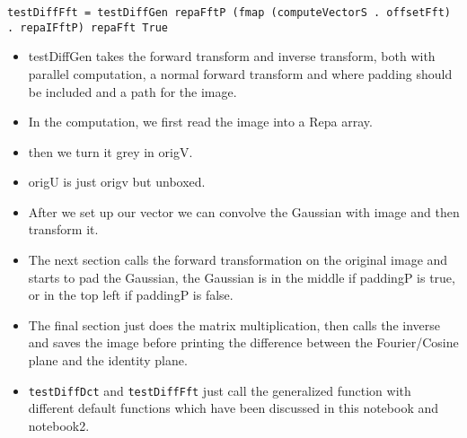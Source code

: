 \documentclass{article}
\begin{document}
\begin{itemize}
\begin{verbatim}
testDiffFft = testDiffGen repaFftP (fmap (computeVectorS . offsetFft) . repaIFftP) repaFft True
\end{verbatim}
\begin{itemize}
\item testDiffGen takes the forward transform and inverse transform, both
with parallel computation, a normal forward transform and where
padding should be included and a path for the image.
\item In the computation, we first read the image into a Repa array.
\item then we turn it grey in origV.
\item origU is just origv but unboxed.
\item After we set up our vector we can convolve the Gaussian with image
and then transform it.
\item The next section calls the forward transformation on the original
image and starts to pad the Gaussian, the Gaussian is in the middle
if paddingP is true, or in the top left if paddingP is false.
\item The final section just does the matrix multiplication, then calls
the inverse and saves the image before printing the difference
between the Fourier/Cosine plane and the identity plane.
\item \texttt{testDiffDct} and \texttt{testDiffFft} just call the generalized function
with different default functions which have been discussed in this
notebook and notebook2.
\end{itemize}
\end{itemize}
\end{document}
